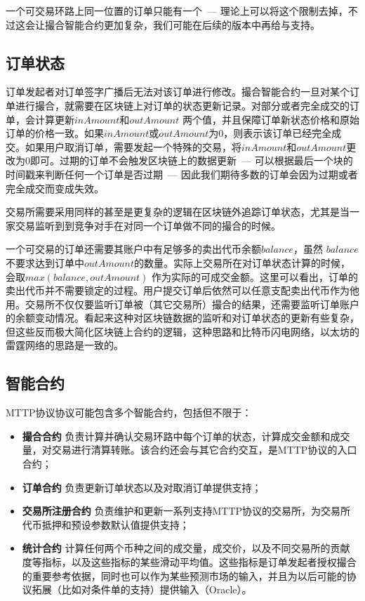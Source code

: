 \documentclass[UTF8,nofonts]{ctexart}
\begin{document}
一个可交易环路上同一位置的订单只能有一个\ --- 理论上可以将这个限制去掉，不过这会让撮合智能合约更加复杂，我们可能在后续的版本中再给与支持。

\subsection{订单状态\label{sec:orderstate}}

订单发起者对订单签字广播后无法对该订单进行修改。撮合智能合约一旦对某个订单进行撮合，就需要在区块链上对订单的状态更新记录。对部分或者完全成交的订单，会计算更新$inAmount$和$outAmount$ 两个值，并且保障订单新状态价格和原始订单的价格一致。如果$inAmount$或$outAmount$为0，则表示该订单已经完全成交。如果用户取消订单，需要发起一个特殊的交易，将$inAmount$和$outAmount$更改为0即可。过期的订单不会触发区块链上的数据更新\ --- 可以根据最后一个块的时间戳来判断任何一个订单是否过期\ --- 因此我们期待多数的订单会因为过期或者完全成交而变成失效。

交易所需要采用同样的甚至是更复杂的逻辑在区块链外追踪订单状态，尤其是当一家交易监听到到竞争对手在对同一个订单做不同的撮合的时候。


一个可交易的订单还需要其账户中有足够多的卖出代币余额$balance$，虽然 $balance$ 不要求达到订单中$outAmount$的数量。实际上交易所在对订单状态计算的时候，会取$max(balance, outAmount)$ 作为实际的可成交金额。这里可以看出，订单的卖出代币并不需要锁定的过程。用户提交订单后依然可以任意支配卖出代币作为他用。交易所不仅仅要监听订单被（其它交易所）撮合的结果，还需要监听订单账户的余额变动情况。看起来这种对区块链数据的监听和对订单状态的更新有些复杂，但这些反而极大简化区块链上合约的逻辑，这种思路和比特币闪电网络，以太坊的雷霆网络的思路是一致的。

\subsection{智能合约\label{sec:contracts}}

MTTP协议协议可能包含多个智能合约，包括但不限于：

\begin{itemize}
  \item  \textbf{撮合合约} 负责计算并确认交易环路中每个订单的状态，计算成交金额和成交量，对交易进行清算转账。该合约还会与其它合约交互，是MTTP协议的入口合约；
  \item   \textbf{订单合约} 负责更新订单状态以及对取消订单提供支持；
  \item  \textbf{交易所注册合约}  负责维护和更新一系列支持MTTP协议的交易所，为交易所代币抵押和预设参数默认值提供支持；
  \item \textbf{统计合约}  计算任何两个币种之间的成交量，成交价，以及不同交易所的贡献度等指标，以及这些指标的某些滑动平均值。这些指标是订单发起者授权撮合的重要参考依据，同时也可以作为某些预测市场的输入，并且为以后可能的协议拓展（比如对条件单的支持）提供输入（Oracle）。

\end{itemize}
\end{document}
